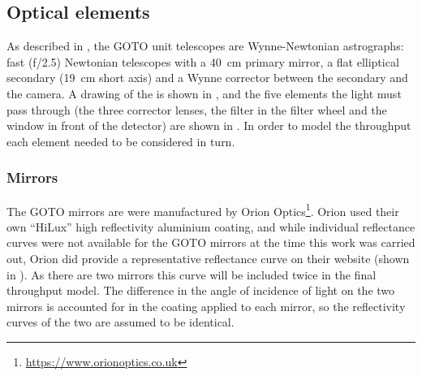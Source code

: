 
\subsection{Optical elements}
\label{sec:optics}
\begin{colsection}

As described in , the GOTO unit telescopes are Wynne-Newtonian astrographs: fast (f/2.5) Newtonian telescopes with a \SI{40}{\centi\meter} primary mirror, a flat elliptical secondary (\SI{19}{\centi\metre} short axis) and a Wynne corrector between the secondary and the camera. A drawing of the  is shown in , and the five elements the light must pass through (the three corrector lenses, the filter in the filter wheel and the window in front of the detector) are shown in . In order to model the throughput each element needed to be considered in turn.

\subsubsection{Mirrors}

The GOTO mirrors are were manufactured by Orion Optics\footnote{\url{https://www.orionoptics.co.uk}}. Orion used their own ``HiLux'' high reflectivity aluminium coating, and while individual reflectance curves were not available for the GOTO mirrors at the time this work was carried out, Orion did provide a representative reflectance curve on their website (shown in ). As there are two mirrors this curve will be included twice in the final throughput model. The difference in the angle of incidence of light on the two mirrors is accounted for in the coating applied to each mirror, so the reflectivity curves of the two are assumed to be identical.

\newpage


\end{colsection}
